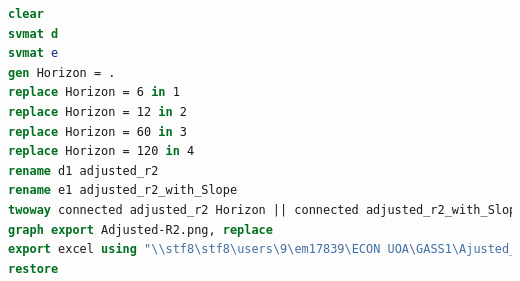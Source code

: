 \documentclass[10pt]{article}
\begin{document}
\begin{lstlisting}[language=STATA]
clear 
svmat d
svmat e
gen Horizon = .
replace Horizon = 6 in 1
replace Horizon = 12 in 2
replace Horizon = 60 in 3
replace Horizon = 120 in 4
rename d1 adjusted_r2
rename e1 adjusted_r2_with_Slope
twoway connected adjusted_r2 Horizon || connected adjusted_r2_with_Slope Horizon, ti("Figure 3: Explanatory power of UIP regression augmented""with relative yield curve slope at different horizons")
graph export Adjusted-R2.png, replace
export excel using "\\stf8\stf8\users\9\em17839\ECON UOA\GASS1\Ajusted_r2.xls", replace
restore




\end{lstlisting}
\end{document}
